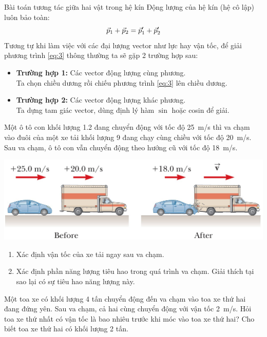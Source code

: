 \begin{dang}{Bài toán tương tác giữa hai vật trong hệ kín}
	Động lượng của hệ kín (hệ cô lập) luôn bảo toàn:
	\begin{equation}
		\vec{p}_1+\vec{p}_2=\vec{p}^\prime_1+\vec{p}^\prime_2\\
		\label{eq:3}
	\end{equation}
	Tương tự khi làm việc với các đại lượng vector như lực hay vận tốc, để giải phương trình \eqref{eq:3} thông thường ta sẽ gặp 2 trường hợp sau:
	\begin{itemize}
		\item \textbf{Trường hợp 1:} Các vector động lượng cùng phương.\\
		Ta chọn chiều dương rồi chiếu phương trình \eqref{eq:3} lên chiều dương.
		\item  \textbf{Trường hợp 2:} Các vector động lượng khác phương.\\
		Ta dựng tam giác vector, dùng định lý hàm $\sin$ hoặc cosin để giải.
	\end{itemize}
	
\end{dang}
\begin{vd}
	Một ô tô con khối lượng \SI{1.2}{} đang chuyển động với tốc độ \SI{25}{\meter/\second} thì va chạm vào đuôi của một xe tải khối lượng \SI{9}{} đang chạy cùng chiều với tốc độ \SI{20}{\meter/\second}. Sau va chạm, ô tô con vẫn chuyển động theo hướng cũ với tốc độ \SI{18}{\meter/\second}.
	\begin{center}
		\includegraphics[scale=0.5]{figs/DONGLUONG-2}
	\end{center}
	\begin{enumerate}[label=\alph*)]
		\item Xác định vận tốc của xe tải ngay sau va chạm.
		\item  Xác định phần năng lượng tiêu hao trong quá trình va chạm. Giải thích tại sao lại có sự tiêu hao năng lượng này.
	\end{enumerate}
\end{vd}
\begin{vd}
	Một toa xe có khối lượng 4 tấn chuyển động đến va chạm vào toa xe thứ hai đang đứng yên. Sau va chạm, cả hai cùng chuyển động với vận tốc \SI{2}{\meter/\second}. Hỏi toa xe thứ nhất có vận tốc là bao nhiêu trước khi móc vào toa xe thứ hai? Cho biết toa xe thứ hai có khối lượng 2 tấn.
\end{vd}
